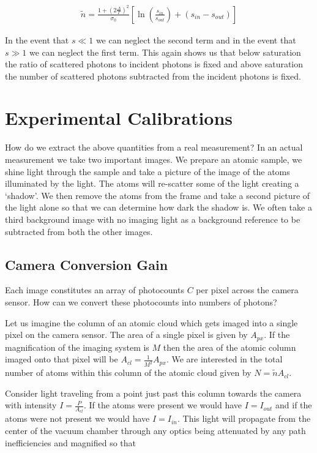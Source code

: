 \documentclass[12pt]{article}
\begin{document}
\begin{align}
\tilde{n} = \frac{1 + \left(2\frac{\Delta}{\Gamma}\right)^2}{\sigma_0} \left[ \ln\left(\frac{s_{in}}{s_{out}}\right) + (s_{in} - s_{out})\right]
\end{align}

In the event that $s\ll1$ we can neglect the second term and in the event that $s\gg1$ we can neglect the first term. 
This again shows us that below saturation the ratio of scattered photons to incident photons is fixed and above saturation the number of scattered photons subtracted from the incident photons is fixed.

\section{Experimental Calibrations}

How do we extract the above quantities from a real measurement?
In an actual measurement we take two important images. 
We prepare an atomic sample, we shine light through the sample and take a picture of the image of the atoms illuminated by the light.
The atoms will re-scatter some of the light creating a `shadow'.
We then remove the atoms from the frame and take a second picture of the light alone so that we can determine how dark the shadow is.
We often take a third background image with no imaging light as a background reference to be subtracted from both the other images.

\subsection{Camera Conversion Gain}

Each image constitutes an array of photocounts $C$ per pixel across the camera sensor.
How can we convert these photocounts into numbers of photons?

Let us imagine the column of an atomic cloud which gets imaged into a single pixel on the camera sensor.
The area of a single pixel is given by $A_{px}$. 
If the magnification of the imaging system is $M$ then the area of the atomic column imaged onto that pixel will be $A_{cl} = \frac{1}{M^2} A_{px}$.
We are interested in the total number of atoms within this column of the atomic cloud given by $N = \tilde{n} A_{cl}$.

Consider light traveling from a point just past this column towards the camera with intensity $I = \frac{P}{A_{cl}}$.
If the atoms were present we would have $I = I_{out}$ and if the atoms were not present we would have $I = I_{in}$.
This light will propagate from the center of the vacuum chamber through any optics being attenuated by any path inefficiencies and magnified so that
\end{document}
